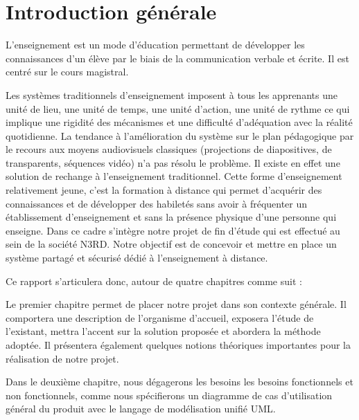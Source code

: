\chapter*{Introduction générale}
\label{chap:introduction}



\medskip

L’enseignement est un mode d’éducation permettant de développer les connaissances d’un
élève par le biais de la communication verbale et écrite. Il est centré sur le cours magistral.
\medskip

Les systèmes traditionnels d’enseignement imposent à tous les apprenants une unité de lieu,
une unité de temps, une unité d’action, une unité de rythme ce qui implique une rigidité des
mécanismes et une difficulté d’adéquation avec la réalité quotidienne. La tendance à l’amélioration du système sur le plan pédagogique par le recours aux moyens audiovisuels classiques
(projections de diapositives, de transparents, séquences vidéo) n’a pas résolu le problème. Il
existe en effet une solution de rechange à l’enseignement traditionnel. Cette forme d’enseignement relativement jeune, c’est la formation à distance qui permet d’acquérir des connaissances
et de développer des habiletés sans avoir à fréquenter un établissement d’enseignement et sans
la présence physique d’une personne qui enseigne. Dans ce cadre s’intègre notre projet de fin
d’étude qui est effectué au sein de la société N3RD. Notre objectif est de concevoir et mettre
en place un système partagé et sécurisé dédié à l’enseignement à distance.

\medskip

Ce rapport s’articulera donc, autour de quatre chapitres comme suit :
\medskip

Le premier chapitre permet de placer notre projet dans son contexte générale. Il comportera
une description de l’organisme d’accueil, exposera l’étude de l’existant, mettra l’accent sur la
solution proposée et abordera la méthode adoptée. Il présentera également quelques notions
théoriques importantes pour la réalisation de notre projet.

\medskip

Dans le deuxième chapitre, nous dégagerons les besoins les besoins fonctionnels et non fonctionnels, comme nous spécifierons un diagramme de cas d’utilisation général du produit avec le
langage de modélisation unifié UML.

\medskip

